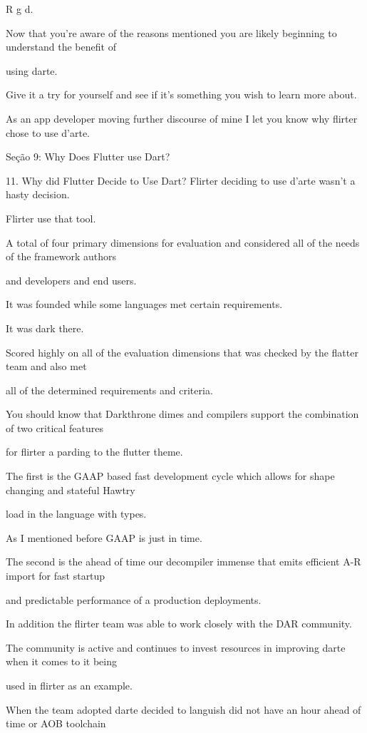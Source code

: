 R g d.

Now that you're aware of the reasons mentioned you are likely beginning to understand the benefit of

using darte.

Give it a try for yourself and see if it's something you wish to learn more about.

As an app developer moving further discourse of mine I let you know why flirter chose to use d'arte.


Seção 9: Why Does Flutter use Dart?

11. Why did Flutter Decide to Use Dart?
Flirter deciding to use d'arte wasn't a hasty decision.

Flirter use that tool.

A total of four primary dimensions for evaluation and considered all of the needs of the framework authors

and developers and end users.

It was founded while some languages met certain requirements.

It was dark there.

Scored highly on all of the evaluation dimensions that was checked by the flatter team and also met

all of the determined requirements and criteria.

You should know that Darkthrone dimes and compilers support the combination of two critical features

for flirter a parding to the flutter theme.

The first is the GAAP based fast development cycle which allows for shape changing and stateful Hawtry

load in the language with types.

As I mentioned before GAAP is just in time.

The second is the ahead of time our decompiler immense that emits efficient A-R import for fast startup

and predictable performance of a production deployments.

In addition the flirter team was able to work closely with the DAR community.

The community is active and continues to invest resources in improving darte when it comes to it being

used in flirter as an example.

When the team adopted darte decided to languish did not have an hour ahead of time or AOB toolchain

